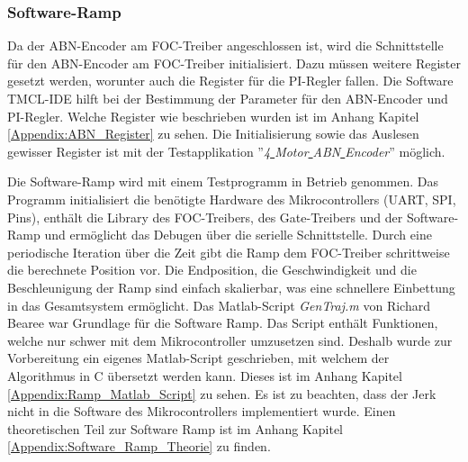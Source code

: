 \subsubsection{Software-Ramp}
\label{subsubsec:Software_Ramp}
 Da der ABN-Encoder am FOC-Treiber angeschlossen ist, wird die Schnittstelle für den ABN-Encoder am FOC-Treiber initialisiert. Dazu müssen weitere Register gesetzt werden, worunter auch die Register für die PI-Regler fallen. Die Software TMCL-IDE hilft bei der Bestimmung der Parameter für den ABN-Encoder und PI-Regler. Welche Register wie beschrieben wurden ist im Anhang Kapitel \ref{Appendix:ABN_Register} zu sehen. Die Initialisierung sowie das Auslesen gewisser Register ist mit der Testapplikation ''\textit{4\underline{ }Motor\underline{ }ABN\underline{ }Encoder}'' möglich.

Die Software-Ramp wird mit einem Testprogramm in Betrieb genommen. Das Programm initialisiert die benötigte Hardware des Mikrocontrollers (UART, SPI, Pins), enthält die Library des FOC-Treibers, des Gate-Treibers und der Software-Ramp und ermöglicht das Debugen über die serielle Schnittstelle. Durch eine periodische Iteration über die Zeit gibt die Ramp dem FOC-Treiber schrittweise die berechnete Position vor. Die Endposition, die Geschwindigkeit und die Beschleunigung der Ramp sind einfach skalierbar, was eine schnellere Einbettung in das Gesamtsystem ermöglicht. Das Matlab-Script \textit{GenTraj.m} von Richard Bearee war Grundlage für die Software Ramp. Das Script enthält Funktionen, welche nur schwer mit dem Mikrocontroller umzusetzen sind. Deshalb wurde zur Vorbereitung ein eigenes Matlab-Script geschrieben, mit welchem der Algorithmus in C übersetzt werden kann. Dieses ist im Anhang Kapitel \ref{Appendix:Ramp_Matlab_Script} zu sehen. Es ist zu beachten, dass der Jerk nicht in die Software des Mikrocontrollers implementiert wurde. Einen theoretischen Teil zur Software Ramp ist im Anhang Kapitel \ref{Appendix:Software_Ramp_Theorie} zu finden.

